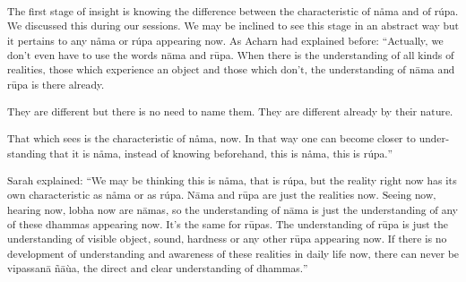 \textsuperscript{\textdutch{The first stage of insight is knowing the
difference between the characteristic of nåma and of rúpa. We discussed
this during our sessions. We may be inclined to see this stage in an
abstract way but it pertains to any nåma or rúpa appearing now. As
Acharn had explained before: ``}\textenglish[variant=american]{Actually,
we don't even have to use the words
n}{{ā}}\textenglish[variant=american]{ma and
r}{{ū}}\textenglish[variant=american]{pa. When there is the
unders}\textdutch{t}\textenglish[variant=american]{anding of all kinds
of realities, those which experience an object and those which don't,
the understanding of n}{{ā}}\textenglish[variant=american]{ma and
r}{{ū}}\textenglish[variant=american]{pa is there already.}}

\textsuperscript{\textdutch{T}\textenglish[variant=american]{hey are
different but }\textdutch{there is }\textenglish[variant=american]{no
need to name them. They are different already by their nature. }}

\textsuperscript{\textenglish[variant=american]{That which sees is the
characteristic of n}\textdutch{å}\textenglish[variant=american]{ma, now.
In that way one can become closer to understanding that it is
n}\textdutch{å}\textenglish[variant=american]{ma, instead of knowing
beforehand, this is n}\textdutch{å}\textenglish[variant=american]{ma,
this is r}\textdutch{ú}\textitalian{pa.}\textdutch{''}}

\textsuperscript{\textdutch{Sarah explained:
``}\textenglish[variant=american]{We may be thinking this is
n}\textdutch{å}\textenglish[variant=american]{ma, that is
r}\textdutch{ú}\textenglish[variant=american]{pa, but the reality right
now has its own characteristic as
n}\textdutch{å}\textenglish[variant=american]{ma or as
r}\textdutch{ú}\textitalian{pa.
}\textdutch{N}{{ā}}\textenglish[variant=american]{ma and
r}{{ū}}\textenglish[variant=american]{pa are just the realities now.
Seeing now, hearing now, lobha now are
n}{{ā}}\textenglish[variant=american]{mas, so the understanding of
n}{{ā}}\textenglish[variant=american]{ma is just the understanding of
any of these dhammas}\textdutch{
}\textenglish[variant=american]{appearing now. It's the same for
r}{{ū}}\textenglish[variant=american]{pas. The understanding of
r}{{ū}}\textenglish[variant=american]{pa is just the understanding of
visible object, sound, hardness or any other
r}{{ū}}\textenglish[variant=american]{pa appearing now.}\textdutch{
}\textenglish[variant=american]{If there is no development of
understanding and awareness of these realities in daily life now, there
can never be vipassan}{{ā}}
ñ{{ā}}\textdutch{ù}\textenglish[variant=american]{a, the direct and
clear understanding of dhammas.}\textdutch{''}}

